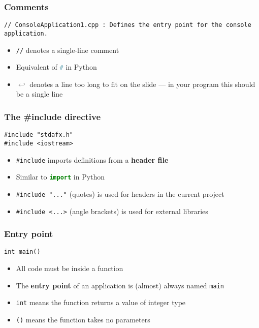 \documentclass[xcolor={dvipsnames}]{beamer}\usepackage{etoolbox}\newtoggle{printable}\togglefalse{printable}
\begin{document}
\begin{frame}[fragile]
	\frametitle{Comments}
	\begin{lstlisting}
// ConsoleApplication1.cpp : Defines the entry point for the console application.
	\end{lstlisting}
	\begin{itemize}
		\item \lstinline{//} denotes a single-line comment
		\item Equivalent of \lstinline[language=Python]{#} in Python
		\item \textcolor{Gray}{$\hookleftarrow$} denotes a line too long to fit on the slide ---
			in your program this should be a single line
	\end{itemize}
\end{frame}

\begin{frame}[fragile]
	\frametitle{The \#include directive}
	\begin{lstlisting}
#include "stdafx.h"
#include <iostream>
	\end{lstlisting}
	\begin{itemize}
		\item \lstinline{#include} imports definitions from a \textbf{header file}
		\item Similar to \lstinline[language=Python]{import} in Python
		\item \lstinline{#include "..."} (quotes) is used for headers in the current project
		\item \lstinline{#include <...>} (angle brackets) is used for external libraries
	\end{itemize}
\end{frame}

\begin{frame}[fragile]
	\frametitle{Entry point}
	\begin{lstlisting}
int main()
	\end{lstlisting}
	\begin{itemize}
		\item All code must be inside a function
		\item The \textbf{entry point} of an application is (almost) always named \lstinline{main}
		\item \lstinline{int} means the function returns a value of integer type
		\item \lstinline{()} means the function takes no parameters
	\end{itemize}
\end{frame}
\end{document}
